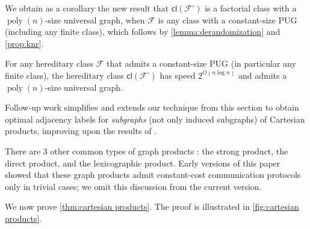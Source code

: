 \documentclass{theoretics}
\makeatletter
\DeclareMathOperator{\poly}{poly}
\newcommand{\cF}{\ensuremath{\mathcal{F}}}
\newcommand{\cl}{\mathsf{cl}}
\newcommand\IfRestateTF{%
  \ifx\label\thmt@gobble@label %
    \expandafter\@firstoftwo
  \else
    \expandafter\@secondoftwo
  \fi
}
\newcommand{\RestateRemark}{\IfRestateTF{{\normalfont\bfseries (Restated) }}{}}
\makeatother
\begin{document}

We obtain as a corollary the new result that $\cl(\cF^\square)$ is a factorial class with a
$\poly(n)$-size universal graph, when $\cF$ is any class with a constant-size PUG (including any
finite class), which follows by \cref{lemma:derandomization} and \cref{prop:knr}.
\begin{corollary}
For any hereditary class $\cF$ that admits a constant-size PUG (in particular any finite class), the
hereditary class $\cl(\cF^\square)$ has speed $2^{O(n \log n)}$ and admits a $\poly(n)$-size universal
graph.
\end{corollary}

Follow-up work \cite{EHZ23} simplifies and extends our technique from this section to obtain optimal
adjacency labels for \emph{subgraphs} (not only induced subgraphs) of Cartesian products, improving
upon the results of \cite{CLR20}.

\begin{remark}
There are 3 other common types of graph products \cite{HIK11}: the strong product, the direct
product, and the lexicographic product. Early versions of this paper showed that these graph
products admit constant-cost communication protocols only in trivial cases; we omit this discussion
from the current version.
\end{remark}

We now prove \cref{thm:cartesian products}.  The proof is illustrated in \cref{fig:cartesian
products}. 
\end{document}
